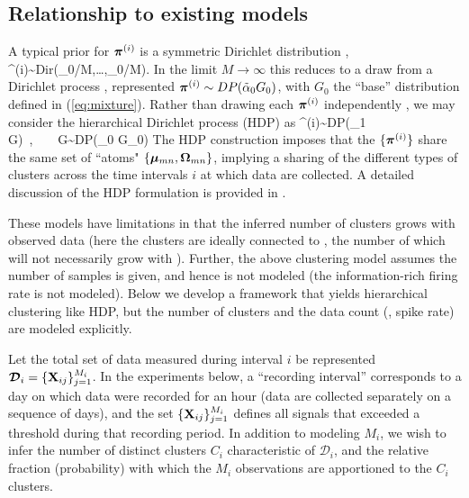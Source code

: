 \documentclass[journal]{IEEEtran}
\begin{document}
\subsection{Relationship to existing models\label{sec:related}}




A typical prior for $\boldsymbol{\pi}^{(i)}$ is a symmetric Dirichlet distribution \cite{Dilan},
\beq \piv^{(i)}\sim\mbox{Dir}(\tilde{\alpha}_0/M,\dots,\tilde{\alpha}_0/M).\label{eq:Dir}\eeq
In the limit\add{,} $M\rightarrow\infty$\add{,} this reduces to a draw from a Dirichlet process \cite{Wood2009,Bo2011}, represented $\boldsymbol{\pi}^{(i)}\sim\relax{DP}(\tilde{\alpha}_0 G_0)$, with $G_0$ the ``base'' distribution defined in (\ref{eq:mixture}). Rather than drawing each $\boldsymbol{\pi}^{(i)}$ independently , we may consider the hierarchical Dirichlet process (HDP) \cite{HDP} as
\beq \piv^{(i)}\sim\mbox{DP}(\tilde{\alpha}_1 G)~,~~~~G\sim\mbox{DP}(\tilde{\alpha}_0 G_0)\eeq
The HDP construction imposes that the $\{\boldsymbol{\pi}^{(i)}\}$ share the same set of ``atoms" $\{\boldsymbol{\mu}_{mn},\boldsymbol{\Omega}_{mn}\}$, implying
a sharing of the different types of clusters across the time intervals $i$ at which data are collected. A detailed discussion of the HDP formulation is provided in \cite{Bo2011}.

These models have limitations in that the inferred number of clusters grows with observed data (here the clusters are ideally connected to , the number of which will not necessarily grow with  ). Further, the above clustering model assumes the number of samples is given, and hence is not modeled (the information-rich firing rate is not modeled).
Below we develop a framework that yields hierarchical clustering like HDP, but the number of clusters and the data count (, spike rate) are modeled explicitly.


Let the total set of data measured during interval $i$ be represented $\bm{\mathcal{D}}_i=\{{\mathbf X}_{ij}\}_{j=1}^{M_i}$. In the experiments below, a ``recording interval'' corresponds to a day on which data were recorded for an hour (data are collected separately on a sequence of days), and the set $\{{\mathbf X}_{ij}\}_{j=1}^{M_i}$ defines all signals that exceeded a threshold during that recording period. In addition to modeling $M_i$, we wish to infer the number of distinct clusters $C_i$ characteristic of $\bm{\mathcal{D}}_i$, and the relative fraction (probability) with which the $M_i$ observations are apportioned to the $C_i$ clusters.
\end{document}
